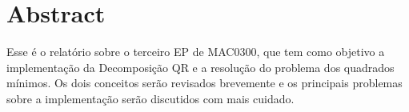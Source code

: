 \documentclass[
10pt, %
a4paper, %
oneside, %
headinclude,footinclude, %
BCOR5mm, %
]{scrartcl}
\title{\normalfont\spacedallcaps{Decomposição QR}} %
\subtitle{\normalfont\spacedallcaps{EP3 - MAC0300}}
\author{\spacedlowsmallcaps{Victor Sena Molero (8941317)}} %
\begin{document}

\renewcommand{\sectionmark}[1]{\markright{\spacedlowsmallcaps{#1}}} %
\lehead{\mbox{\llap{\small\thepage\kern1em\color{halfgray} \vline}\color{halfgray}\hspace{0.5em}\rightmark\hfil}} %

\pagestyle{scrheadings} %


\maketitle %

\setcounter{tocdepth}{2} %

\tableofcontents %



\section*{Abstract} %

Esse é o relatório sobre o terceiro EP de MAC0300, que tem como objetivo a implementação da Decomposição QR e a resolução do problema dos quadrados mínimos. Os dois conceitos serão revisados brevemente e os principais problemas sobre a implementação serão discutidos com mais cuidado.
\end{document}
